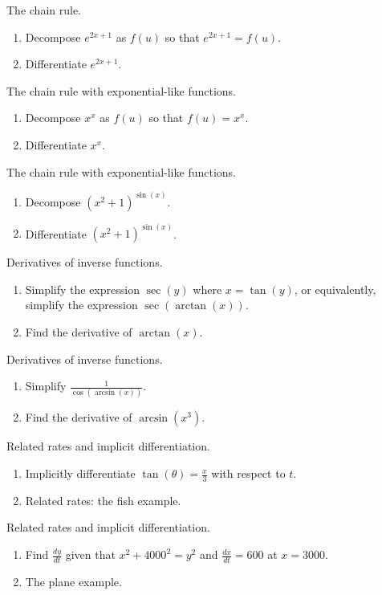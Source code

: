\documentclass[../main.tex]{subfiles}
\begin{document}
 

The chain rule.
\begin{enumerate}
  \item Decompose \(e^{2x + 1}\) as \(f(u)\) so that \(e^{2x + 1} = f(u)\).  

  \item Differentiate \(e^{2x+1}\).
\end{enumerate}

The chain rule with exponential-like functions.
\begin{enumerate}
  \item Decompose \(x^{x}\) as \(f(u)\) so that \(f(u) = x^{x}\).

  \item Differentiate \(x^{x}\).
\end{enumerate}

The chain rule with exponential-like functions.
\begin{enumerate}
  \item Decompose \((x^{2}+1)^{\sin(x)}\).  
  \item Differentiate \((x^{2}+1)^{\sin(x)}\).
\end{enumerate}

Derivatives of inverse functions.
\begin{enumerate}
  \item Simplify the expression \(\sec(y)\) where \(x = \tan(y)\), or equivalently, simplify the expression \(\sec(\arctan(x))\).
  \item Find the derivative of \(\arctan(x)\).
\end{enumerate}

Derivatives of inverse functions.
\begin{enumerate}
  \item Simplify \(\frac{1}{\cos(\arcsin(x))}\).
  \item Find the derivative of \(\arcsin(x^{3})\).
\end{enumerate}

Related rates and implicit differentiation.
\begin{enumerate}
  \item Implicitly differentiate \(\tan(\theta) = \frac{x}{3}\) with respect to \(t\).
  \item Related rates: the fish example.
\end{enumerate}

Related rates and implicit differentiation.
\begin{enumerate}
  \item Find \(\frac{dy}{dt}\) given that \(x^{2} + 4000^{2} = y^{2}\) and \(\frac{dx}{dt} = 600\) at \(x = 3000\).

  \item The plane example.
\end{enumerate}
\end{document}
